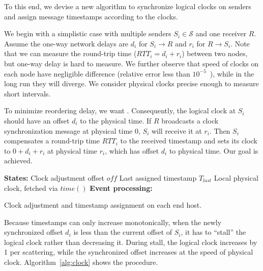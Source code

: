 To this end, we devise a new algorithm to synchronize logical clocks on senders and assign message timestamps according to the clocks.

We begin with a simplistic case with multiple senders $S_i \in \mathcal{S}$ and one receiver $R$.
Assume the one-way network delays are $d_i$ for $S_i \rightarrow R$ and $r_i$ for $R \rightarrow S_i$.
Note that we can measure the round-trip time ($RTT_i = d_i + r_i$) between two nodes, but one-way delay is hard to measure.
We further observe that speed of clocks on each node have negligible difference (relative error less than $10^{-5}$~\cite{corbett2013spanner,geng2018exploiting}), while in the long run they will diverge.
We consider physical clocks precise enough to measure short intervals.

To minimize reordering delay, we want .
Consequently, the logical clock at $S_i$ should have an offset $d_i$ to the physical time.
If $R$ broadcasts a clock synchronization message at physical time 0, $S_i$ will receive it at $r_i$.
Then $S_i$ compensates a round-trip time $RTT_i$ to the received timestamp and sets its clock to $0 + d_i + r_i$ at physical time $r_i$, which has offset $d_i$ to physical time.
Our goal is achieved.


\begin{algorithm}[t]
 \DontPrintSemicolon
 \textbf{States:} Clock adjustment offset $off$\;
 \qquad Last assigned timestamp $T_{last}$\;
 \qquad Local physical clock, fetched via $time()$\;
 \textbf{Event processing:}\;
 \caption{Clock adjustment and timestamp assignment on each end host.}
 \label{alg:clock}
\end{algorithm}


Because timestamps can only increase monotonically, when the newly synchronized offset $d_i$ is less than the current offset of $S_i$, it has to ``stall'' the logical clock rather than decreasing it.
During stall, the logical clock increases by 1 per scattering, while the synchronized offset increases at the speed of physical clock.
Algorithm~\ref{alg:clock} shows the procedure.

